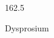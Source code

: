 \documentclass[12pt]{article}
\begin{document}
\hfill{}
\vfill
\begin{center}
  {\fontsize{50}{60}
  }

  162.5

Dysprosium
\end{center}
\vfill
\end{document}

